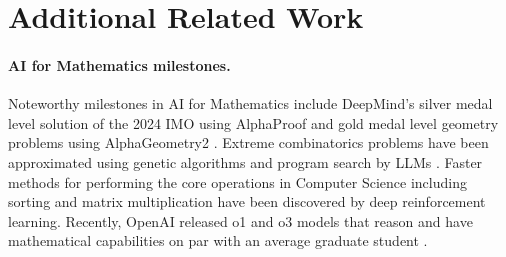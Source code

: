 \section{Additional Related Work}
\label{appendix:Z}

\paragraph{AI for Mathematics milestones.}
Noteworthy milestones in AI for Mathematics \cite{miaoartificial} include DeepMind's silver medal level solution of the 2024 IMO \cite{deepmindsilverblog} using AlphaProof and gold medal level geometry problems using AlphaGeometry2 \cite{chervonyi2025gold,trinh2024alphageometry,deepmindsilverlean}. Extreme combinatorics problems have been approximated using genetic algorithms and program search by LLMs \cite{romera2024mathematical}. Faster methods for performing the core operations in Computer Science including sorting \cite{mankowitz2023faster} and matrix multiplication \cite{fawzi2022discovering} have been discovered by deep reinforcement learning. Recently, OpenAI released o1 \cite{strawberry} and o3 models that reason and have mathematical capabilities on par with an average graduate student \cite{tao2024gpt}. 

